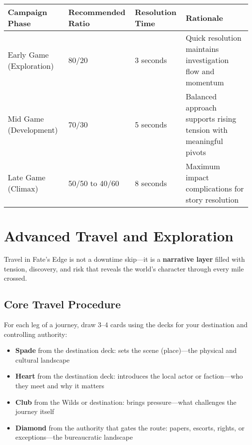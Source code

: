\begin{fatebox}
\begin{tabularx}{\textwidth}{lXXX}
\toprule
\textbf{Campaign Phase} & \textbf{Recommended Ratio} & \textbf{Resolution Time} & \textbf{Rationale} \\
\midrule
Early Game (Exploration) & 80/20 & 3 seconds & Quick resolution maintains investigation flow and momentum \\
Mid Game (Development) & 70/30 & 5 seconds & Balanced approach supports rising tension with meaningful pivots \\
Late Game (Climax) & 50/50 to 40/60 & 8 seconds & Maximum impact complications for story resolution \\
\bottomrule
\end{tabularx}
\end{fatebox}

\section*{Advanced Travel and Exploration}

Travel in Fate's Edge is not a downtime skip---it is a \textbf{narrative layer} filled with tension, discovery, and risk that reveals the world's character through every mile crossed.

\subsection*{Core Travel Procedure}

For each leg of a journey, draw 3--4 cards using the decks for your destination and controlling authority:

\begin{itemize}
    \item \textbf{Spade} from the destination deck: sets the scene (place)---the physical and cultural landscape
    \item \textbf{Heart} from the destination deck: introduces the local actor or faction---who they meet and why it matters
    \item \textbf{Club} from the Wilds or destination: brings pressure---what challenges the journey itself
    \item \textbf{Diamond} from the authority that gates the route: papers, escorts, rights, or exceptions---the bureaucratic landscape
\end{itemize}

